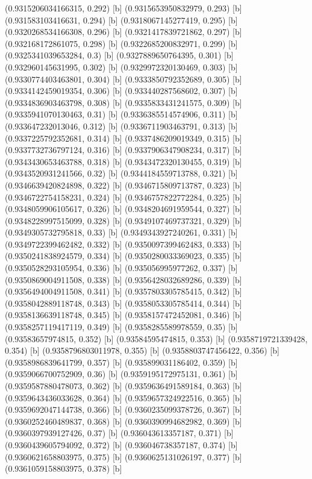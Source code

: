 {{{(0.9315206034166315, 0.292) [b] 
(0.9315653950832979, 0.293) [b] 
(0.931583103416631, 0.294) [b] 
(0.9318067145277419, 0.295) [b] 
(0.9320268534166308, 0.296) [b] 
(0.9321417839721862, 0.297) [b] 
(0.932168172861075, 0.298) [b] 
(0.9322685200832971, 0.299) [b] 
(0.9325341039653284, 0.3) [b] 
(0.9327889650764395, 0.301) [b] 
(0.932960145631995, 0.302) [b] 
(0.9329972320130469, 0.303) [b] 
(0.9330774403463801, 0.304) [b] 
(0.9333850792352689, 0.305) [b] 
(0.9334142459019354, 0.306) [b] 
(0.933440287568602, 0.307) [b] 
(0.9334836903463798, 0.308) [b] 
(0.9335833431241575, 0.309) [b] 
(0.9335941070130463, 0.31) [b] 
(0.9336385514574906, 0.311) [b] 
(0.933647232013046, 0.312) [b] 
(0.9336711903463791, 0.313) [b] 
(0.9337225792352681, 0.314) [b] 
(0.9337486209019349, 0.315) [b] 
(0.9337732736797124, 0.316) [b] 
(0.9337906347908234, 0.317) [b] 
(0.9343430653463788, 0.318) [b] 
(0.9343472320130455, 0.319) [b] 
(0.9343520931241566, 0.32) [b] 
(0.9344184559713788, 0.321) [b] 
(0.9346639420824898, 0.322) [b] 
(0.9346715809713787, 0.323) [b] 
(0.9346722754158231, 0.324) [b] 
(0.9346757822772284, 0.325) [b] 
(0.9348059906105617, 0.326) [b] 
(0.9348204691959544, 0.327) [b] 
(0.9348228997515099, 0.328) [b] 
(0.9349107469737321, 0.329) [b] 
(0.9349305732795818, 0.33) [b] 
(0.9349343927240261, 0.331) [b] 
(0.9349722399462482, 0.332) [b] 
(0.9350097399462483, 0.333) [b] 
(0.9350241838924579, 0.334) [b] 
(0.9350280033369023, 0.335) [b] 
(0.9350528293105954, 0.336) [b] 
(0.935056995977262, 0.337) [b] 
(0.9350869004911508, 0.338) [b] 
(0.9356428032689286, 0.339) [b] 
(0.9356494004911508, 0.341) [b] 
(0.9357803305785415, 0.342) [b] 
(0.9358042889118748, 0.343) [b] 
(0.9358053305785414, 0.344) [b] 
(0.9358136639118748, 0.345) [b] 
(0.9358157472452081, 0.346) [b] 
(0.9358257119417119, 0.349) [b] 
(0.9358285589978559, 0.35) [b] 
(0.93583657974815, 0.352) [b] 
(0.93584595474815, 0.353) [b] 
(0.9358719721339428, 0.354) [b] 
(0.9358796803011978, 0.355) [b] 
(0.9358803747456422, 0.356) [b] 
(0.9358986839641799, 0.357) [b] 
(0.935899031186402, 0.359) [b] 
(0.9359066700752909, 0.36) [b] 
(0.9359195172975131, 0.361) [b] 
(0.9359587880478073, 0.362) [b] 
(0.9359636491589184, 0.363) [b] 
(0.9359643436033628, 0.364) [b] 
(0.9359657324922516, 0.365) [b] 
(0.9359692047144738, 0.366) [b] 
(0.9360235099378726, 0.367) [b] 
(0.9360252460489837, 0.368) [b] 
(0.9360390994682982, 0.369) [b] 
(0.9360397939127426, 0.37) [b] 
(0.936043613357187, 0.371) [b] 
(0.9360439605794092, 0.372) [b] 
(0.936046738357187, 0.374) [b] 
(0.9360621658803975, 0.375) [b] 
(0.9360625131026197, 0.377) [b] 
(0.9361059158803975, 0.378) [b] 
}}}
